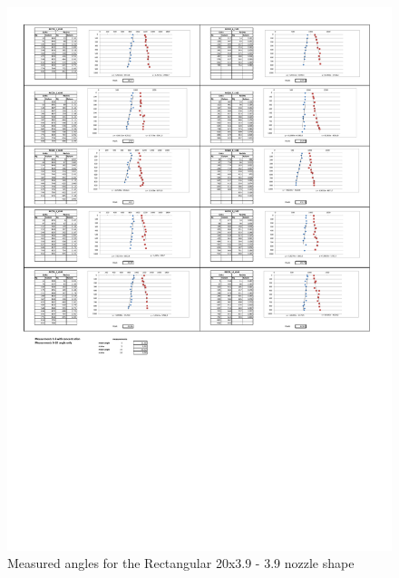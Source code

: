 \begin{figure}[ht]
    \centering
    \includegraphics[width=\linewidth]{Images/Rec20_39.pdf}
    \caption{Measured angles for the Rectangular 20x3.9 - 3.9 nozzle shape}
\end{figure}

